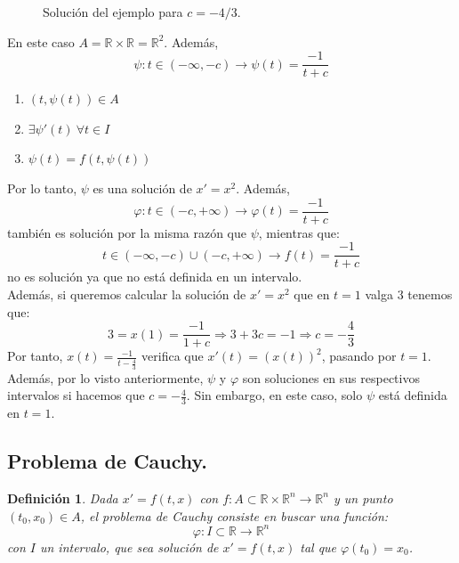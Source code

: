 \documentclass[11pt, a4paper,twoside]{article}
\makeatletter
\theoremstyle{theorem-style}  %
\renewenvironment{proof}[1][\proofname]{\par
	\pushQED{\qed}%
	\normalfont \topsep6\p@\@plus6\p@\relax
	\list{}{%
		\settowidth{\leftmargin}{\quad:\hskip\labelsep}%
		\setlength{\labelwidth}{0pt}%
		\setlength{\itemindent}{-\leftmargin}%
	}%
	\item[\hskip\labelsep\itshape#1\@addpunct{:}]\ignorespaces
}{%
	\popQED\endlist\@endpefalse
}
\theoremstyle{definition-style}
\newtheorem{definition}{Definición}[section]
\theoremstyle{example-style}
\makeatother
\begin{document}
\begin{proof}[Solución]
\begin{figure}[h]
		\caption{Solución del ejemplo para $ c=-4/3 $.} \label{E1}
	\end{figure}
	
	

	
	
	En este caso $A = \mathbb{R} \times \mathbb{R} = \mathbb{R}^2$. Además,
	\[\psi:t \in (- \infty, - c) \longrightarrow \psi(t) = \frac{-1}{t+c}\]
	\begin{enumerate}
		\item $(t, \psi(t)) \in A$
		\item $\exists \psi' (t) \ \forall t \in I$
		\item $\psi (t) = f(t, \psi (t))$
	\end{enumerate}
	Por lo tanto, $\psi$ es una solución de $x'=x^2$. Además,
	\[\varphi:t \in (-c, +\infty ) \longrightarrow \varphi(t) = \frac{-1}{t+c}\]
	también es solución por la misma razón que $\psi$, mientras que:
	\[t \in (- \infty, - c) \cup (-c, +\infty ) \longrightarrow f(t) = \frac{-1}{t+c}\]
	no es solución ya que no está definida en un intervalo. \\
	Además, si queremos calcular la solución de $x'=x^2$ que en $t =1$ valga $3$ tenemos que:
	\[3 = x(1) = \frac{-1}{1+c} \Rightarrow 3 + 3c = -1 \Rightarrow c = -\frac{4}{3}\]
	Por tanto, $x(t) = \frac{-1}{t-\frac{4}{3}}$ verifica que $x'(t) = (x(t))^2$, pasando por $ t=1 $. Además, por lo visto anteriormente, $\psi$ y $\varphi$ son soluciones en sus respectivos intervalos si hacemos que $c = - \frac{4}{3}$. Sin embargo, en este caso, solo $ \psi $ está definida en $ t=1 $.
\end{proof}
\subsection{Problema de Cauchy.}

\begin{definition}
	Dada $x' = f(t, x)$ con $f: A \subset \mathbb{R} \times \mathbb{R}^n \longrightarrow \mathbb{R}^n$ y un punto $(t_0, x_0) \in A$, el problema de Cauchy consiste en buscar una función:
	\[\varphi : I \subset \mathbb{R} \longrightarrow \mathbb{R}^n\]
	con $I$ un intervalo, que sea solución de $x' = f(t, x)$ tal que $\varphi (t_0) = x_0$.
\end{definition}
\end{document}
